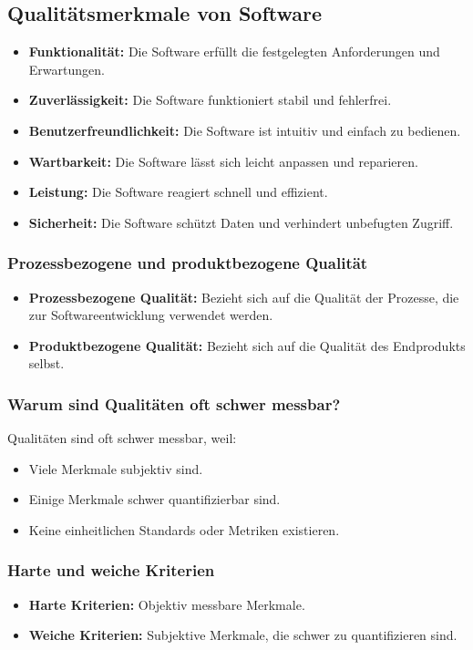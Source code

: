 \documentclass[main.tex]{subfiles}
\begin{document}
\subsection{Qualitätsmerkmale von Software}
\begin{itemize}
    \item \textbf{Funktionalität:} Die Software erfüllt die festgelegten Anforderungen und Erwartungen.
    \item \textbf{Zuverlässigkeit:} Die Software funktioniert stabil und fehlerfrei.
    \item \textbf{Benutzerfreundlichkeit:} Die Software ist intuitiv und einfach zu bedienen.
    \item \textbf{Wartbarkeit:} Die Software lässt sich leicht anpassen und reparieren.
    \item \textbf{Leistung:} Die Software reagiert schnell und effizient.
    \item \textbf{Sicherheit:} Die Software schützt Daten und verhindert unbefugten Zugriff.
\end{itemize}

\subsubsection*{Prozessbezogene und produktbezogene Qualität}
\begin{itemize}
    \item \textbf{Prozessbezogene Qualität:} Bezieht sich auf die Qualität der Prozesse, die zur Softwareentwicklung verwendet werden.
    \item \textbf{Produktbezogene Qualität:} Bezieht sich auf die Qualität des Endprodukts selbst.
\end{itemize}

\subsubsection*{Warum sind Qualitäten oft schwer messbar?}
Qualitäten sind oft schwer messbar, weil:
\begin{itemize}
    \item Viele Merkmale subjektiv sind.
    \item Einige Merkmale schwer quantifizierbar sind.
    \item Keine einheitlichen Standards oder Metriken existieren.
\end{itemize}


\subsubsection*{Harte und weiche Kriterien}
\begin{itemize}
    \item \textbf{Harte Kriterien:} Objektiv messbare Merkmale.
    \item \textbf{Weiche Kriterien:} Subjektive Merkmale, die schwer zu quantifizieren sind.
\end{itemize}
\end{document}
